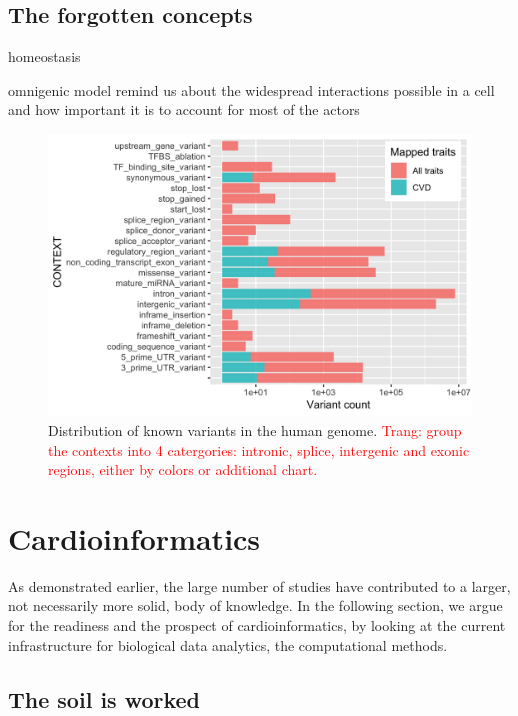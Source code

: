 \documentclass[letter]{bioinfo}
\newcommand{\comment}[1]{\textcolor{red}{#1}}
\begin{document}
\subsection{The forgotten concepts}

homeostasis

omnigenic model remind us about the widespread interactions possible in a cell and how important it is to account for most of the actors




\begin{figure}[!tpb]
	\includegraphics[width=1\linewidth]{variant_contexts_sigVars}
	\caption{Distribution of known variants in the human genome. \comment{Trang: group the contexts into 4 catergories: intronic, splice, intergenic and exonic regions, either by colors or additional chart.}}
	\label{fig:variant_context}
\end{figure}

%




%
\section{Cardioinformatics}
As demonstrated earlier, the large number of studies have contributed to a larger, not necessarily more solid, body of knowledge. In the following section, we argue for the readiness and the prospect of cardioinformatics, by looking at the current infrastructure for biological data analytics, the computational methods.

\subsection{The soil is worked}
\end{document}
